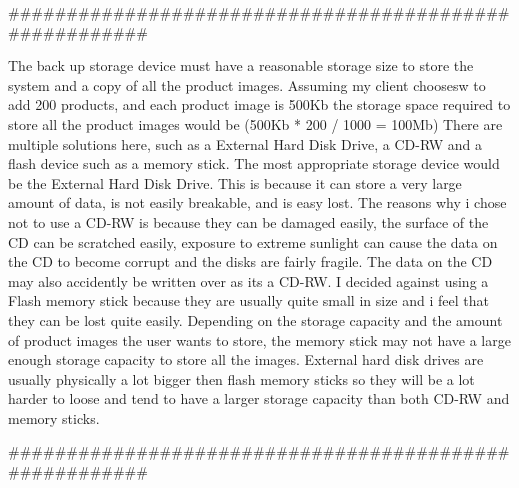 

#######################################################

The back up storage device must have a reasonable storage size to store the system and a copy of all the product images. Assuming my client choosesw to add 200 products, and each product image is 500Kb the storage space required to store all the product images would be (500Kb * 200 / 1000 = 100Mb) There are multiple solutions here, such as a External Hard Disk Drive, a CD-RW and a flash device such as a memory stick.  The most appropriate storage device would be the External Hard Disk Drive. This is because it can store a very large amount of data, is not easily breakable, and is easy lost. The reasons why i chose not to use a CD-RW is because they can be damaged easily, the surface of the CD can be scratched easily, exposure to extreme sunlight can cause the data on the CD to become corrupt and the disks are fairly fragile. The data on the CD may also accidently be written over as its a CD-RW. I decided against using a Flash memory stick because they are usually quite small in size and i feel that they can be lost quite easily. Depending on the storage capacity and the amount of product images the user wants to store, the memory stick may not have a large enough storage capacity to store all the images. External hard disk drives are usually physically a lot bigger then flash memory sticks so they will be a lot harder to loose and tend to have a larger storage capacity than both CD-RW and memory sticks.\par

#######################################################

